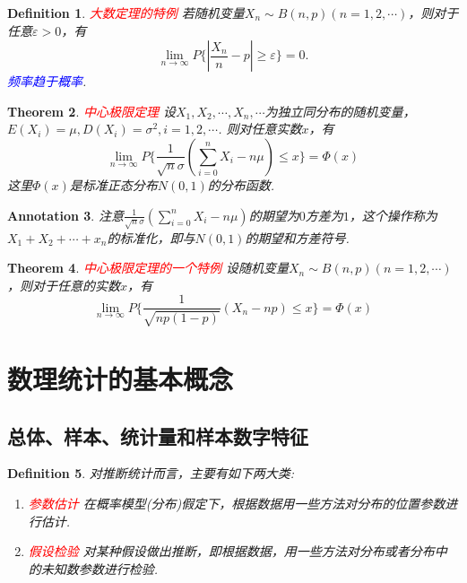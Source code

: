 \documentclass{article}
\newtheorem{theorem}{Theorem}[section]
\newtheorem{definition}[theorem]{Definition}
\newtheorem{annotation}[theorem]{Annotation}
\newcommand{\redt}[1]{\textcolor{red}{#1}}
\newcommand{\bluet}[1]{\textcolor{blue}{#1}}
\begin{document}
\begin{definition}
\rm \redt{大数定理的特例} 若随机变量$X_n \sim B(n,p)(n=1,2,\cdots)$，则对于任意$\varepsilon > 0$，有
$$
\lim\limits_{n \rightarrow \infty}P\{|\frac{X_n}{n} -p| \geq \varepsilon\} = 0.
$$
\bluet{频率趋于概率}. 
\end{definition}

\begin{theorem}
\rm \redt{中心极限定理} 设$X_1,X_2,\cdots,X_n,\cdots$为独立同分布的随机变量，$E(X_i)=\mu,D(X_i)=\sigma^2,i=1,2,\cdots$. 则对任意实数$x$，有
$$
\lim\limits_{n \rightarrow \infty}P\{\frac{1}{\sqrt{n}\sigma}(\sum\limits_{i=0}^nX_i - n\mu) \leq x\} = \Phi(x)
$$
这里$\Phi(x)$是标准正态分布$N(0,1)$的分布函数. 
\end{theorem}



\begin{annotation}
\rm 注意$\frac{1}{\sqrt{n}\sigma}(\sum\limits_{i=0}^nX_i - n\mu)$的期望为$0$方差为$1$，这个操作称为$X_1 + X_2 +\cdots + x_n$的标准化，即与$N(0,1)$的期望和方差符号. 
\end{annotation}

\begin{theorem}
\rm \redt{中心极限定理的一个特例} 设随机变量$X_n \sim B(n,p)(n=1,2,\cdots)$，则对于任意的实数$x$，有
$$
\lim\limits_{n \rightarrow \infty}P\{\frac{1}{\sqrt{np(1-p)}}(X_n - np) \leq x\} = \Phi(x)
$$
\end{theorem}


\newpage
\section{数理统计的基本概念}

\subsection{总体、样本、统计量和样本数字特征}

\begin{definition}
\rm 对推断统计而言，主要有如下两大类:
\begin{enumerate}
	\item \redt{参数估计} 在概率模型(分布)假定下，根据数据用一些方法对分布的位置参数进行估计. 
	\item \redt{假设检验} 对某种假设做出推断，即根据数据，用一些方法对分布或者分布中的未知数参数进行检验. 
\end{enumerate}
\end{definition}
\end{document}
